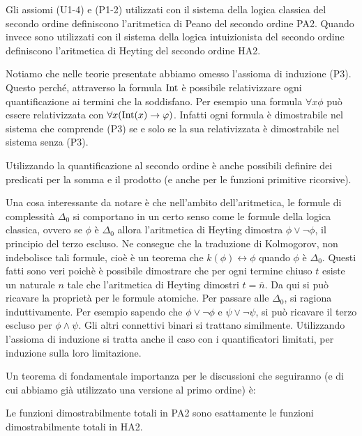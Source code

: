 \documentclass[]{marticle}
\begin{document}
\begin{block}[Definizione]
    Gli assiomi (U1-4) e (P1-2) utilizzati con il sistema della logica classica
    del secondo ordine definiscono l'aritmetica di Peano del secondo ordine PA2.
    Quando invece sono utilizzati con il sistema della logica intuizionista del
    secondo ordine definiscono l'aritmetica di Heyting del secondo ordine HA2.
\end{block}

Notiamo che nelle teorie presentate abbiamo omesso l'assioma di induzione (P3).
Questo perch\'e, attraverso la formula $\text{Int}$ \`e possibile relativizzare ogni
quantificazione ai termini che la soddisfano. Per esempio una formula $\forall x
\phi$ pu\`o essere relativizzata con $\forall x (\text{Int}(x)\rightarrow \varphi)$. Infatti
ogni formula \`e dimostrabile nel sistema che comprende (P3) se e solo se la sua
relativizzata \`e dimostrabile nel sistema senza (P3).

Utilizzando la quantificazione al secondo ordine \`e anche possibili definire
dei predicati per la somma e il prodotto (e anche per le funzioni primitive
ricorsive).

Una cosa interessante da notare \`e che nell'ambito dell'aritmetica, le formule
di complessit\`a $\Delta_0$ si comportano in un certo senso come le formule
della logica classica, ovvero se $\phi$ \`e $\Delta_0$ allora l'aritmetica di
Heyting dimostra $\phi\lor \lnot \phi$, il principio del terzo escluso. Ne
consegue che la traduzione di Kolmogorov, non indebolisce tali formule, cio\`e
\`e un teorema che $k(\phi)\leftrightarrow \phi$ quando $\phi$ \`e $\Delta_0$.
Questi fatti sono veri poich\`e \`e possibile dimostrare che per ogni termine
chiuso $t$ esiste un naturale $n$ tale che l'aritmetica di Heyting dimostri
$t=\overline{n}$. Da qui si pu\`o ricavare la propriet\`a per le formule
atomiche. Per passare alle $\Delta_0$, si ragiona induttivamente. Per esempio
sapendo che $\phi\lor\lnot\phi$ e $\psi\lor\lnot\psi$, si pu\`o ricavare il
terzo escluso per $\phi\land\psi$. Gli altri connettivi binari si trattano
similmente. Utilizzando l'assioma di induzione si tratta anche il caso con i
quantificatori limitati, per induzione sulla loro limitazione. 

Un teorema di fondamentale importanza per le discussioni che seguiranno (e di
cui abbiamo gi\`a utilizzato una versione al primo ordine) \`e:
\begin{block}[Teorema]
    Le funzioni dimostrabilmente totali in PA2 sono esattamente le funzioni
    dimostrabilmente totali in HA2.
\end{block}
\end{document}
